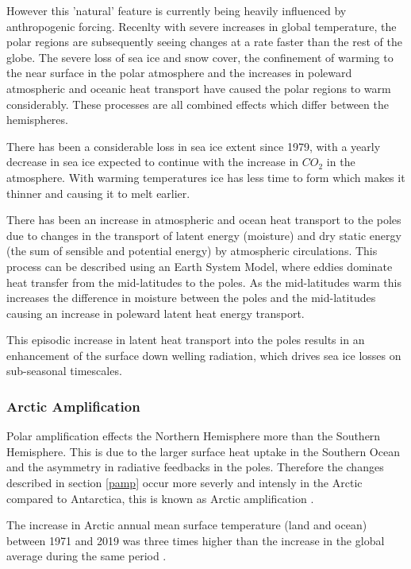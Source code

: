 \documentclass[12pt, oneside]{article}
\begin{document}
However this 'natural' feature is currently being heavily influenced by anthropogenic forcing. Recenlty with severe increases in global temperature, the polar regions are subsequently seeing changes at a rate faster than the rest of the globe. The severe loss of sea ice and snow cover, the confinement of warming to the near surface in the polar atmosphere and the increases in poleward atmospheric and oceanic heat transport have caused the polar regions to warm considerably. These processes are all combined effects which differ between the hemispheres.

There has been a considerable loss in sea ice extent since 1979, with a yearly decrease in sea ice expected to continue with the increase in $CO_2$ in the atmosphere. With warming temperatures ice has less time to form which makes it thinner and causing it to melt earlier. 

There has been an increase in atmospheric and ocean heat transport to the poles due to changes in the transport of latent energy (moisture) and dry static energy (the sum of sensible and potential energy) by atmospheric circulations. This process can be described using an Earth System Model, where eddies dominate heat transfer from the mid-latitudes to the poles. As the mid-latitudes warm this increases the difference in moisture between the poles and the mid-latitudes causing an increase in poleward latent heat energy transport. 

This episodic increase in latent heat transport into the poles results in an enhancement of the surface down welling radiation, which drives sea ice losses on sub-seasonal timescales. 


\subsubsection{Arctic Amplification}

Polar amplification effects the Northern Hemisphere more than the Southern Hemisphere. This is due to the larger surface heat uptake in the Southern Ocean and the asymmetry in radiative feedbacks in the poles. Therefore the changes described in section \ref{pamp} occur more severly and intensly in the Arctic compared to Antarctica, this is known as Arctic amplification \cite{england2021recent}. 

The increase in Arctic annual mean surface temperature (land and ocean) between 1971 and 2019 was three times higher than the increase in the global average during the same period \cite{AMAP}. 
\end{document}
